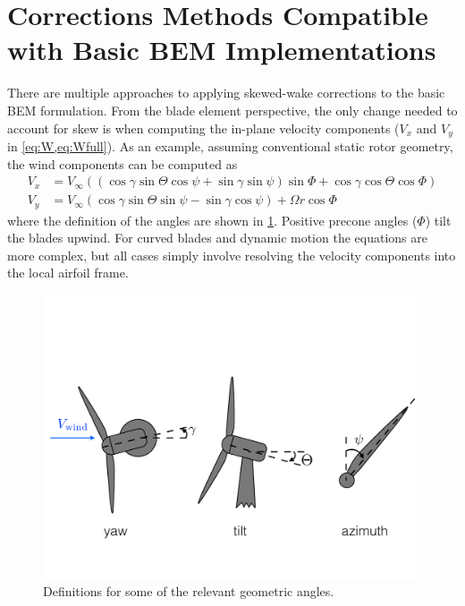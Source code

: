 \documentclass[]{aiaa-tc}%
\begin{document}
\section{Corrections Methods Compatible with Basic BEM Implementations}
\label{sec:simple}
There are multiple approaches to applying skewed-wake corrections to the basic BEM formulation.  From the blade element perspective, the only change needed to account for skew is when computing the in-plane velocity components ($V_x$ and $V_y$ in \cref{eq:W,eq:Wfull}).  As an example, assuming conventional static rotor geometry, the wind components can be computed as
\begin{equation}
\begin{aligned}
V_x &= V_\infty ((\cos \gamma \sin \Theta \cos \psi + \sin \gamma \sin \psi)\sin \Phi + \cos \gamma \cos \Theta \cos \Phi)\\
V_y &= V_\infty (\cos \gamma \sin \Theta\sin \psi - \sin \gamma \cos \psi) + \Omega r \cos\Phi
\label{eq:Vrel}
\end{aligned}
\end{equation}
where the definition of the angles are shown in \cref{fig:angles}.  Positive precone angles ($\Phi$) tilt the blades upwind.  For curved blades and dynamic motion the equations are more complex, but all cases simply involve resolving the velocity components into the local airfoil frame.

\begin{figure}[htbp]
\centering
\includegraphics[width=5.5in]{images/angles}
\caption{Definitions for some of the relevant geometric angles.}
\label{fig:angles}
\end{figure}
\end{document}
